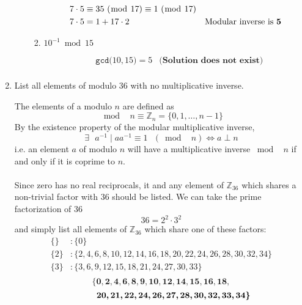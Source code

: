 \documentclass[12pt]{article}
\newenvironment{answer}
{ \begin{tcolorbox}[halign=left]
    }
    {  
  \end{tcolorbox}
}
\begin{document}
\begin{enumerate}
\begin{enumerate}
\begin{enumerate}
\begin{answer}
\begin{align*}
          &7 \cdot 5 \equiv 35 \text{ } (\bmod \text{ } 17) \equiv 1 \text{ } (\bmod \text{ }17)  & \\
          &7 \cdot 5 = 1 + 17 \cdot 2 & \text{Modular inverse is \textbf{5}} \\
        \end{align*}
      \end{answer}
    \item $10^{-1} \bmod 15$
       \begin{answer}
        \begin{align*}
          &\texttt{gcd(}10,15\texttt{)} = 5 & \textbf{(Solution does not exist)} \\
        \end{align*}
      \end{answer}
    \end{enumerate}
    
  \end{enumerate}

  \newpage
  
\item List all elements of modulo 36 with no multiplicative inverse.
  \begin{answer}
    The elements of a modulo $n$ are defined as
    \[ \bmod \text{ }n \equiv \mathbb{Z}_n = \{0, 1,\ldots, n-1 \}\]
    By the existence property of the modular multiplicative inverse,
    \[ \exists \text{ } a^{-1} \mid aa^{-1} \equiv 1 \text{ }(\bmod\text{ } n) \Longleftrightarrow a \perp n\]
    i.e. an element $a$ of modulo $n$ will have a multiplicative inverse $\bmod\text{ } n$ if and only if it is coprime to $n$.
    \\~\\ Since zero has no real reciprocals, it and any element of $\mathbb{Z}_{36}$ which shares a non-trivial factor with 36 should be listed. We can take the prime factorization of 36
    \[ 36 = 2^2 \cdot 3^2 \]
    and simply list all elements of $\mathbb{Z}_{36}$ which share one of these factors:
    \begin{align*}
      \{\} &: \{0\} \\
      \{2\} &: \{2, 4, 6, 8, 10, 12, 14, 16, 18, 20, 22, 24, 26, 28, 30, 32, 34\}\\
      \{3\} &: \{3, 6, 9, 12, 15, 18, 21, 24, 27, 30, 33\}\\     
    \end{align*}
    \[\bm{\{0, 2, 4, 6, 8, 9, 10, 12, 14, 15, 16, 18,}\]
    \[\text{\hspace{1cm}}\bm{20, 21, 22, 24, 26, 27, 28, 30, 32, 33, 34\}}\]
  \end{answer}


\end{enumerate}
\end{document}
